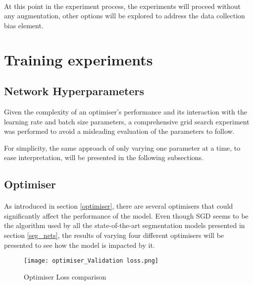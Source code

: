 \paragraph{}
At this point in the experiment process, the experiments will proceed without any augmentation, other options will be explored to address the data collection bias element.

\section{Training experiments}
\subsection{Network Hyperparameters}
Given the complexity of an optimiser's performance and its interaction with the learning rate and batch size parameters, a comprehensive grid search experiment was performed to avoid a misleading evaluation of the parameters to follow.

For simplicity, the same approach of only varying one parameter at a time, to ease interpretation, will be presented in the following subsections.

\subsection{Optimiser}
\paragraph{}
As introduced  in section \ref{optimiser}, there are several optimisers that could significantly affect the performance of the model. Even though \gls{SGD} seems to be the algorithm used by all the state-of-the-art segmentation models presented in section \ref{seg_nets}, the results of varying four different optimisers will be presented to see how the model is impacted by it.

\begin{figure}[hbt!]
    \centering
    \texttt{[image: optimiser\_Validation loss.png]}
    \caption{Optimiser Loss comparison}
    \label{opt_loss}
\end{figure}

